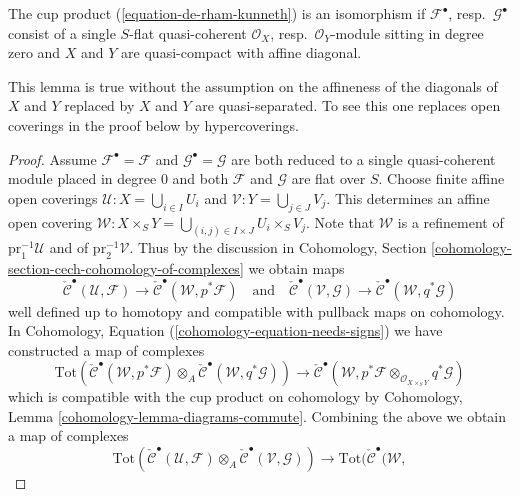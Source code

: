 \begin{lemma}
\label{lemma-kunneth-single-sheaf}
The cup product (\ref{equation-de-rham-kunneth}) is an isomorphism if
$\mathcal{F}^\bullet$, resp.\ $\mathcal{G}^\bullet$ consist of a single
$S$-flat quasi-coherent $\mathcal{O}_X$, resp.\ $\mathcal{O}_Y$-module
sitting in degree zero and $X$ and $Y$ are
quasi-compact with affine diagonal.
\end{lemma}

\noindent
This lemma is true without the assumption on the affineness of the
diagonals of $X$ and $Y$ replaced by $X$ and $Y$ are quasi-separated.
To see this one replaces open coverings in the proof below by hypercoverings.

\begin{proof}
Assume $\mathcal{F}^\bullet = \mathcal{F}$ and
$\mathcal{G}^\bullet = \mathcal{G}$ are both reduced to
a single quasi-coherent module placed in degree $0$ and
both $\mathcal{F}$ and $\mathcal{G}$ are flat over $S$.
Choose finite affine open coverings
$\mathcal{U} : X = \bigcup_{i \in I} U_i$ and
$\mathcal{V} : Y = \bigcup_{j \in J} V_j$.
This determines an affine open covering
$\mathcal{W} : X \times_S Y = \bigcup_{(i, j) \in I \times J} U_i \times_S V_j$.
Note that $\mathcal{W}$ is a refinement of
$\text{pr}_1^{-1}\mathcal{U}$ and of $\text{pr}_2^{-1}\mathcal{V}$.
Thus by the discussion in Cohomology, Section
\ref{cohomology-section-cech-cohomology-of-complexes}
we obtain maps
$$
\check{\mathcal{C}}^\bullet(\mathcal{U}, \mathcal{F})
\to
\check{\mathcal{C}}^\bullet(\mathcal{W}, p^*\mathcal{F})
\quad\text{and}\quad
\check{\mathcal{C}}^\bullet(\mathcal{V}, \mathcal{G})
\to
\check{\mathcal{C}}^\bullet(\mathcal{W}, q^*\mathcal{G})
$$
well defined up to homotopy and compatible with pullback maps on cohomology.
In Cohomology, Equation (\ref{cohomology-equation-needs-signs})
we have constructed a map of complexes
$$
\text{Tot}(
\check{\mathcal{C}}^\bullet(\mathcal{W}, p^*\mathcal{F})
\otimes_A
\check{\mathcal{C}}^\bullet(\mathcal{W}, q^*\mathcal{G}))
\longrightarrow
\check{\mathcal{C}}^\bullet(\mathcal{W},
p^*\mathcal{F} \otimes_{\mathcal{O}_{X \times_S Y}}
q^*\mathcal{G})
$$
which is compatible with the cup product on cohomology by
Cohomology, Lemma \ref{cohomology-lemma-diagrams-commute}.
Combining the above we obtain a map of complexes
\begin{equation}
\label{equation-kunneth-on-cech}
\text{Tot}(
\check{\mathcal{C}}^\bullet(\mathcal{U}, \mathcal{F})
\otimes_A
\check{\mathcal{C}}^\bullet(\mathcal{V}, \mathcal{G}))
\to
\text{Tot}(\check{\mathcal{C}}^\bullet(\mathcal{W},

\end{equation}
\end{proof}

